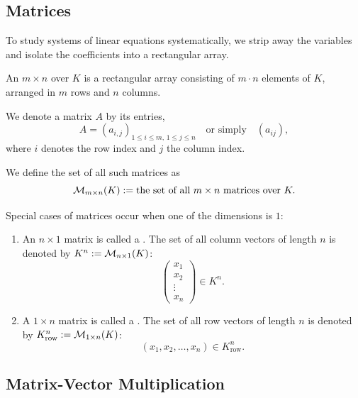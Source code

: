\subsection{Matrices}

To study systems of linear equations systematically, we strip away the variables and isolate the coefficients into a rectangular array.

\begin{definition}[Matrix]
\label{def:matrix}
An $m \times n$  over $K$ is a rectangular array consisting of $m \cdot n$ elements of $K$, arranged in $m$ rows and $n$ columns.
\end{definition}

\begin{notation}
We denote a matrix $A$ by its entries,
\[
A = (a_{i,j})_{1 \le i \le m, \, 1 \le j \le n} \quad \text{or simply} \quad (a_{ij}),
\]
where $i$ denotes the row index and $j$ the column index.
\end{notation}

We define the set of all such matrices as
\begin{equation*}
    \mathcal{M}_{m \times n}(K) := \text{the set of all } m \times n \text{ matrices over } K.
\end{equation*}

\begin{definition}
\label{def:row_and_column_vectors}
Special cases of matrices occur when one of the dimensions is $1$:
\begin{enumerate}[label=\textbf{(\alph*)}]
    \item An $n \times 1$ matrix is called a . The set of all column vectors of length $n$ is denoted by $K^n := \mathcal{M}_{n \times 1}(K)$:
    \[
    \begin{pmatrix} x_1 \\ x_2 \\ \vdots \\ x_n \end{pmatrix} \in K^n.
    \]
    \item A $1 \times n$ matrix is called a . The set of all row vectors of length $n$ is denoted by $K_{\text{row}}^n := \mathcal{M}_{1 \times n}(K)$:
    \[
    (x_1, x_2, \dots, x_n) \in K_{\text{row}}^n.
    \]
\end{enumerate}
\end{definition}

\subsection{Matrix-Vector Multiplication}

